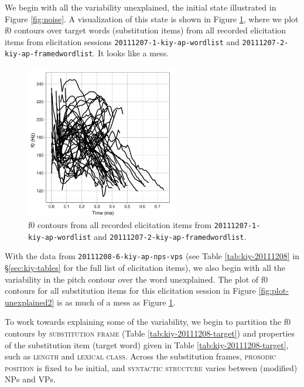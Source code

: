 \documentclass[12pt]{article}
\begin{document}
We begin with all the variability unexplained, the initial state
illustrated in Figure \ref{fig:noise}. A visualization of this state
is shown in Figure \ref{fig:plot-mess}, where we plot f0 contours over
target words (substitution items) from all recorded elicitation items
from elicitation sessions \texttt{20111207-1-kiy-ap-wordlist} and
\texttt{20111207-2-kiy-ap-framedwordlist}. It looks like a mess.

\begin{figure}[h]
  \centering
  \includegraphics[width=0.6\textwidth]{kiy-20111207-plot-unexplained}%
\caption{f0 contours from all recorded elicitation items from
    \texttt{20111207-1-kiy-ap-wordlist} and \texttt{20111207-2-kiy-ap-framedwordlist}.}
  \label{fig:plot-mess}
\end{figure}

With the data from \texttt{20111208-6-kiy-ap-nps-vps} (see Table
\ref{tab:kiy-20111208} in \S\ref{sec:kiy-tables} for the full list of
elicitation items), we also begin
with all the variability in the pitch contour over the word
unexplained. The plot of f0 contours for all substitution
items for this elicitation session in Figure
\ref{fig:plot-unexplained2} is as much of a
mess as Figure \ref{fig:plot-mess}. 

To work towards explaining some of the variability, we begin to
partition the f0 contours by \textsc{substitution frame} (Table
\ref{tab:kiy-20111208-target}) and properties of the substitution item
(target word) given in Table \ref{tab:kiy-20111208-target}, such as
\textsc{length} and \textsc{lexical class}. Across the substitution
frames, \textsc{prosodic position} is fixed to be initial, and
\textsc{syntactic structure} varies between (modified) NPs and VPs. 
\end{document}
